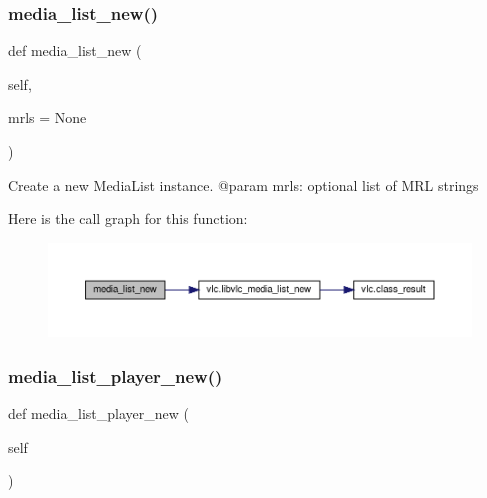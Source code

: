 \subsubsection{\texorpdfstring{media\+\_\+list\+\_\+new()}{media\_list\_new()}}
{\footnotesize\ttfamily def media\+\_\+list\+\_\+new (\begin{DoxyParamCaption}\item[{}]{self,  }\item[{}]{mrls = {\ttfamily None} }\end{DoxyParamCaption})}

\begin{DoxyVerb}Create a new MediaList instance.
@param mrls: optional list of MRL strings
\end{DoxyVerb}
 Here is the call graph for this function\+:
\nopagebreak
\begin{figure}[H]
\begin{center}
\leavevmode
\includegraphics[width=350pt]{classvlc_1_1_instance_ab3c8e7cd9dd61ca1657ba238cd4cf476_cgraph}
\end{center}
\end{figure}
\mbox{\label{classvlc_1_1_instance_af64a515387ea79e6f6f97621283c4a33}} 
\subsubsection{\texorpdfstring{media\+\_\+list\+\_\+player\+\_\+new()}{media\_list\_player\_new()}}
{\footnotesize\ttfamily def media\+\_\+list\+\_\+player\+\_\+new (\begin{DoxyParamCaption}\item[{}]{self }\end{DoxyParamCaption})}

